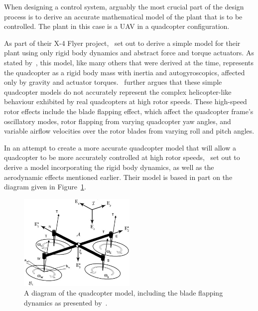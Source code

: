 When designing a control system, arguably the most crucial part of the design process is to derive an accurate mathematical model of the plant that is to be controlled. The plant in this case is a UAV in a quadcopter configuration. 

As part of their X-4 Flyer project,~\cite{hamel2002dynamic} set out to derive a simple model for their plant using only rigid body dynamics and abstract force and torque actuators. As stated by~\cite{Pounds2010c}, this model, like many others that were derived at the time, represents the quadcopter as a rigid body mass with inertia and autogyroscopics, affected only by gravity and actuator torques.~\citeauthor{Pounds2010c} further argues that these simple quadcopter models do not accurately represent the complex helicopter-like behaviour exhibited by real quadcopters at high rotor speeds. These high-speed rotor effects include the blade flapping effect, which affect the quadcopter frame's oscillatory modes, rotor flapping from varying quadcopter yaw angles, and variable airflow velocities over the rotor blades from varying roll and pitch angles.

In an attempt to create a more accurate quadcopter model that will allow a quadcopter to be more accurately controlled at high rotor speeds,~\citeauthor{Pounds2010c} set out to derive a model incorporating the rigid body dynamics, as well as the aerodynamic effects mentioned earlier. Their model is based in part on the diagram given in Figure~\ref{fig:chap2-quad-model}.

\begin{figure}
  \centering
  \includegraphics[width=0.5\textwidth]{figures/chapter2/pounds_quad-model.jpg}
  \caption[A diagram of the quadcopter model, including the blade flapping dynamics.]{A diagram of the quadcopter model, including the blade flapping dynamics as presented by~\cite{Pounds2010c}.}
\label{fig:chap2-quad-model}
\end{figure}

